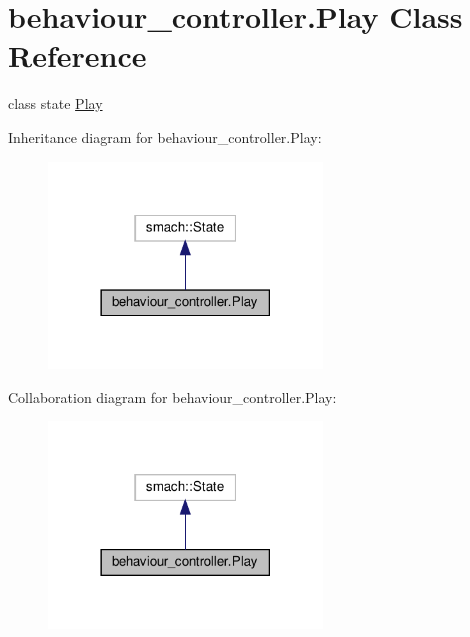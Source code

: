 \hypertarget{classbehaviour__controller_1_1Play}{}\section{behaviour\+\_\+controller.\+Play Class Reference}
\label{classbehaviour__controller_1_1Play}


class state \hyperlink{classbehaviour__controller_1_1Play}{Play}  




Inheritance diagram for behaviour\+\_\+controller.\+Play\+:\nopagebreak
\begin{figure}[H]
\begin{center}
\leavevmode
\includegraphics[width=206pt]{classbehaviour__controller_1_1Play__inherit__graph}
\end{center}
\end{figure}


Collaboration diagram for behaviour\+\_\+controller.\+Play\+:\nopagebreak
\begin{figure}[H]
\begin{center}
\leavevmode
\includegraphics[width=206pt]{classbehaviour__controller_1_1Play__coll__graph}
\end{center}
\end{figure}
